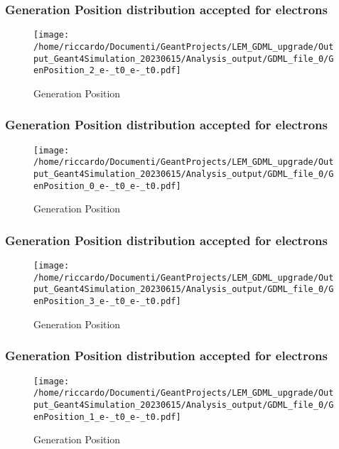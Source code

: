 \documentclass[8pt]{beamer}
\begin{document}
        \begin{frame}
            \frametitle{Generation Position distribution accepted for electrons}
        
        \begin{figure}[h]
            \centering
            \texttt{[image: /home/riccardo/Documenti/GeantProjects/LEM\_GDML\_upgrade/Output\_Geant4Simulation\_20230615/Analysis\_output/GDML\_file\_0/GenPosition\_2\_e-\_t0\_e-\_t0.pdf]}
            \caption{Generation Position}
        \end{figure}
        
        \end{frame}
        
        \begin{frame}
            \frametitle{Generation Position distribution accepted for electrons}
        
        \begin{figure}[h]
            \centering
            \texttt{[image: /home/riccardo/Documenti/GeantProjects/LEM\_GDML\_upgrade/Output\_Geant4Simulation\_20230615/Analysis\_output/GDML\_file\_0/GenPosition\_0\_e-\_t0\_e-\_t0.pdf]}
            \caption{Generation Position}
        \end{figure}
        
        \end{frame}
        
        \begin{frame}
            \frametitle{Generation Position distribution accepted for electrons}
        
        \begin{figure}[h]
            \centering
            \texttt{[image: /home/riccardo/Documenti/GeantProjects/LEM\_GDML\_upgrade/Output\_Geant4Simulation\_20230615/Analysis\_output/GDML\_file\_0/GenPosition\_3\_e-\_t0\_e-\_t0.pdf]}
            \caption{Generation Position}
        \end{figure}
        
        \end{frame}
        
        \begin{frame}
            \frametitle{Generation Position distribution accepted for electrons}
        
        \begin{figure}[h]
            \centering
            \texttt{[image: /home/riccardo/Documenti/GeantProjects/LEM\_GDML\_upgrade/Output\_Geant4Simulation\_20230615/Analysis\_output/GDML\_file\_0/GenPosition\_1\_e-\_t0\_e-\_t0.pdf]}
            \caption{Generation Position}
        \end{figure}
        
        \end{frame}
        
\end{document}
